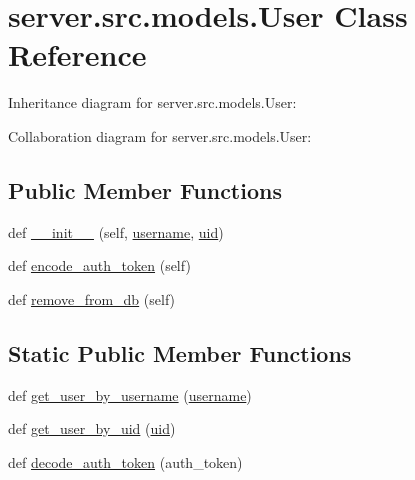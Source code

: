 \hypertarget{classserver_1_1src_1_1models_1_1_user}{}\section{server.\+src.\+models.\+User Class Reference}
\label{classserver_1_1src_1_1models_1_1_user}


Inheritance diagram for server.\+src.\+models.\+User\+:


Collaboration diagram for server.\+src.\+models.\+User\+:
\subsection*{Public Member Functions}
\begin{DoxyCompactItemize}
\item 
def \hyperlink{classserver_1_1src_1_1models_1_1_user_a5ab48c788bcf8c5b9d6c6f562baedbad}{\+\_\+\+\_\+init\+\_\+\+\_\+} (self, \hyperlink{classserver_1_1src_1_1models_1_1_user_acb75051a64b473f00340abd8d8cd379a}{username}, \hyperlink{classserver_1_1src_1_1models_1_1_user_a9a4d7dce0947f4e81278a993244fb3e7}{uid})
\item 
def \hyperlink{classserver_1_1src_1_1models_1_1_user_afe0ff6d68b9cd0018b148105f7eaa670}{encode\+\_\+auth\+\_\+token} (self)
\item 
def \hyperlink{classserver_1_1src_1_1models_1_1_user_a4f935c1ffff6886e4fed9a007550420d}{remove\+\_\+from\+\_\+db} (self)
\end{DoxyCompactItemize}
\subsection*{Static Public Member Functions}
\begin{DoxyCompactItemize}
\item 
def \hyperlink{classserver_1_1src_1_1models_1_1_user_aadaa85113e78dda0f8d043b25a833f4e}{get\+\_\+user\+\_\+by\+\_\+username} (\hyperlink{classserver_1_1src_1_1models_1_1_user_acb75051a64b473f00340abd8d8cd379a}{username})
\item 
def \hyperlink{classserver_1_1src_1_1models_1_1_user_a9dc609228ed203a670fc27853c11e1e9}{get\+\_\+user\+\_\+by\+\_\+uid} (\hyperlink{classserver_1_1src_1_1models_1_1_user_a9a4d7dce0947f4e81278a993244fb3e7}{uid})
\item 
def \hyperlink{classserver_1_1src_1_1models_1_1_user_a2c6b2817ce55a8d86e3dfc26d590f727}{decode\+\_\+auth\+\_\+token} (auth\+\_\+token)
\end{DoxyCompactItemize}
